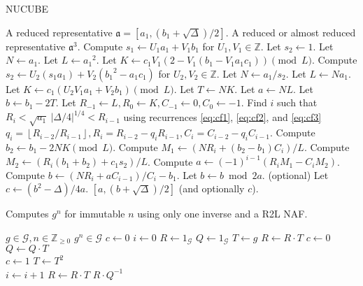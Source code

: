 \documentclass{ucalgthes1}
\theoremstyle{plain}
\theoremstyle{definition}
\newcommand{\ZZ}{\mathbb{Z}}
\newcommand{\ZZgez}{\mathbb{Z}_{\ge 0}}
\newcommand{\floor}[1]{\left\lfloor #1 \right\rfloor}
\begin{document}
\begin{algorithm}[h]
\caption{NUCUBE}
\label{alg:nucube}
\begin{algorithmic}[1]
\REQUIRE A reduced representative $\mathfrak a = [a_1, (b_1+\sqrt\Delta)/2]$.
\ENSURE A reduced or almost reduced representative $\mathfrak a^3$.
\STATE Compute $s_1 \leftarrow U_1a_1 + V_1b_1$ for $U_1,V_1 \in \ZZ$.
	\STATE Let $s_2 \leftarrow 1$.
	\STATE Let $N \leftarrow a_1$.
	\STATE Let $L \leftarrow {a_1}^2$.
	\STATE Let $K \leftarrow c_1V_1(2-V_1(b_1-V_1a_1c_1)) \pmod L$.
\ELSE
	\STATE Compute $s_2 \leftarrow U_2(s_1a_1) + V_2({b_1}^2-a_1c_1)$ for $U_2, V_2 \in \ZZ$.
	\STATE Let $N \leftarrow a_1/s_2$.
	\STATE Let $L \leftarrow Na_1$.
	\STATE Let $K \leftarrow c_1(U_2V_1a_1+V_2b_1) \pmod L$.
\ENDIF
{}
	\STATE Let $T \leftarrow NK$.
	\STATE Let $a \leftarrow NL$.
	\STATE Let $b \leftarrow b_1 - 2T$.
\ELSE
	\STATE Let $R_{-1} \leftarrow L, R_0 \leftarrow K, C_{-1} \leftarrow 0, C_0 \leftarrow -1$.
	\STATE Find $i$ such that $R_i < \sqrt{a_1} ~ |\Delta/4|^{1/4} < R_{i-1}$ using recurrences \eqref{eq:cf1}, \eqref{eq:cf2}, and \eqref{eq:cf3} \break $q_i = \floor{R_{i-2}/R_{i-1}}, R_i = R_{i-2}-q_i R_{i-1}, C_i=C_{i-2}-q_i C_{i-1}$.
	\STATE Compute $b_2 \leftarrow b_1 -2NK \pmod L$.
	\STATE Compute $M_1 \leftarrow (NR_i + (b_2-b_1)C_i)/L$.
	\STATE Compute $M_2 \leftarrow (R_i(b_1+b_2)+c_1s_2)/L$.
	\STATE Compute $a \leftarrow (-1)^{i-1}(R_iM_1-C_iM_2)$.
	\STATE Compute $b \leftarrow (NR_i + aC_{i-1})/C_i-b_1$.
\ENDIF
\STATE Let $b \leftarrow b \bmod 2a$.
\STATE (optional) Let $c \leftarrow (b^2-\Delta)/4a$.
\RETURN $[a, (b+\sqrt\Delta)/2]$ (and optionally $c$).
\end{algorithmic}
\end{algorithm}


\begin{algorithm}[htb!]
\caption{Computes $g^n$ for immutable $n$ using only one inverse and a R2L NAF.}\label{alg:nafR2LImmutable}
\begin{algorithmic}[1]
\REQUIRE $g \in \mathcal G, n \in \ZZgez$
\ENSURE $g^n \in \mathcal G$
\STATE $c \gets 0$ 
\STATE $i \gets 0$
\STATE $R \gets 1_{\mathcal G}$ 
\STATE $Q \gets 1_{\mathcal G}$ 
\STATE $T \gets g$ 
	\IF {$\floor{n/2^i}+c \equiv 1 \pmod 4$}
		\STATE $R \gets R \cdot T$
		\STATE $c \gets 0$
	\ELSIF {$\floor{n/2^i}+c \equiv 3 \pmod 4$}
		\STATE $Q \gets Q \cdot T$ \\
		\STATE $c \gets 1$
	\ENDIF
	\STATE $T \gets T^2$ \\
	\STATE $i \gets i+1$
\ENDWHILE
{} \STATE $R \gets R \cdot T$ \ENDIF
\RETURN $R \cdot Q^{-1}$
\end{algorithmic}
\end{algorithm}
\end{document}
